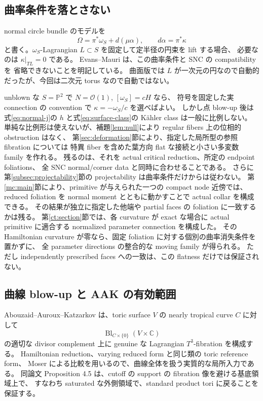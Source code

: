 \documentclass[11pt,a4paper]{article}
\theoremstyle{definition}
\newcommand{\PP}{\mathbb P}
\newcommand{\CC}{\mathbb C}
\newcommand{\Bl}{\operatorname{Bl}}
\begin{document}
\subsection{曲率条件を落とさない}

normal circle bundle のモデルを
\[
\Omega=\pi^*\omega_S+d(\mu\alpha),\qquad d\alpha=\pi^*\kappa
\]
と書く。$\omega_S$-Lagrangian $L\subset S$ を固定して定半径の円束を lift する場合、
必要なのは $\kappa|_{TL}=0$ である。
Evans--Mauri \cite[Lemma 2.22, Remark 2.23]{em} は、この曲率条件と SNC の compatibility を
省略できないことを明記している。
曲面版では $L$ が一次元の円なので自動的だったが、今回は二次元 torus なので自動ではない。

unblown な $S=\PP^2$ で $N=\mathcal O(1)$, $[\omega_S]=cH$ なら、
符号を固定した実 connection の convention で
$\kappa=-\omega_S/c$ を選べばよい。
しかし点 blow-up 後は式\eqref{eq:normal-j}の $h$ と式\eqref{eq:surface-class}の
Kähler class は一般に比例しない。
単純な比例形は使えないが、補題\ref{lem:null}により regular fibers 上の位相的 obstruction はなく、
第\ref{sec:deformation}節により、指定した局所型の参照 fibration については
特異 fiber を含めた葉方向 flat な接続と小さい多変数 family を作れる。
残るのは、それを actual critical reduction、所定の endpoint foliations、
全 SNC normal/corner data と同時に合わせることである。
さらに第\ref{subsec:projectability}節の projectability は曲率条件だけからは従わない。
第\ref{mc:main}節により、primitive が与えられた一つの compact node 近傍では、
reduced foliation を normal moment とともに動かすことで actual collar を構成できる。
その結果が独立に指定した他端や partial faces の foliation に一致するかは残る。
第\ref{ct:section}節では、各 curvature が exact な場合に actual primitive に適合する
normalized parameter connection を構成した。
その Hamiltonian curvature が零なら、固定 foliation に対する個別の曲率消失条件を置かずに、
全 parameter directions の整合的な moving family が得られる。
ただし independently prescribed faces への一致は、この flatness だけでは保証されない。

\subsection{曲線 blow-up と AAK の有効範囲}

Abouzaid--Auroux--Katzarkov \cite[Section 4]{aak} は、toric surface $V$ の nearly tropical curve $C$ に対して
\[
\Bl_{C\times\{0\}}(V\times\CC)
\]
の適切な divisor complement 上に genuine な Lagrangian $T^3$-fibration を構成する。
Hamiltonian reduction、varying reduced form と同じ類の toric reference form、
Moser による比較を用いるので、曲線全体を扱う実質的な局所入力である。
同論文 Proposition 4.5 は、cutoff の support の fibration 像を避ける基底領域上で、
すなわち saturated な外側領域で、standard product tori に戻ることを保証する。
\end{document}
